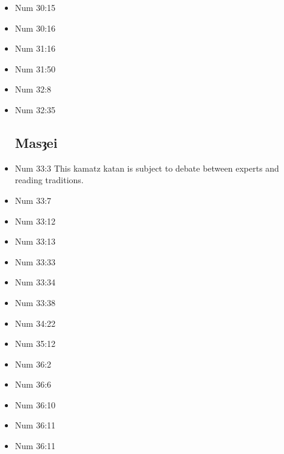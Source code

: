 \documentclass[14pt]{book}
\begin{document}
\begin{multicols}{2}
\begin{itemize}
\item Num 30:15

\item Num 30:16

\item Num 31:16

\item Num 31:50

\item Num 32:8

\item Num 32:35

\subsection{Masȝei}

\item Num 33:3 This kamatz katan is subject to debate between experts and reading traditions.

\item Num 33:7

\item Num 33:12

\item Num 33:13

\item Num 33:33

\item Num 33:34

\item Num 33:38

\item Num 34:22

\item Num 35:12

\item Num 36:2

\item Num 36:6

\item Num 36:10

\item Num 36:11

\item Num 36:11
\end{itemize}\end{multicols}
\end{document}
